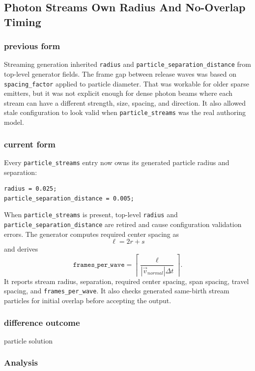 \subsection{Photon Streams Own Radius And No-Overlap Timing}

\subsubsection{previous form}

Streaming generation inherited \texttt{radius} and
\texttt{particle\_separation\_distance} from top-level generator fields.  The
frame gap between release waves was based on \texttt{spacing\_factor} applied
to particle diameter.  That was workable for older sparse emitters, but it
was not explicit enough for dense photon beams where each stream can have a
different strength, size, spacing, and direction.  It also allowed stale
configuration to look valid when \texttt{particle\_streams} was the real
authoring model.

\subsubsection{current form}

Every \texttt{particle\_streams} entry now owns its generated particle radius
and separation:
\begin{verbatim}
radius = 0.025;
particle_separation_distance = 0.005;
\end{verbatim}
When \texttt{particle\_streams} is present, top-level
\texttt{radius} and \texttt{particle\_separation\_distance} are retired and
cause configuration validation errors.  The generator computes required
center spacing as
\[
    \ell = 2r + s
\]
and derives
\[
    \texttt{frames\_per\_wave}
    =
    \left\lceil
      \frac{\ell}{|\vec{v}_{normal}|\Delta t}
    \right\rceil .
\]
It reports stream radius, separation, required center spacing, span spacing,
travel spacing, and \texttt{frames\_per\_wave}.  It also checks generated
same-birth stream particles for initial overlap before accepting the output.

\subsubsection{difference outcome}

particle solution

\subsubsection{Analysis}

